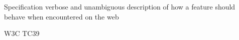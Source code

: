 Specification
  verbose and unambiguous description of how a feature should behave when encountered on the web 

W3C 
TC39